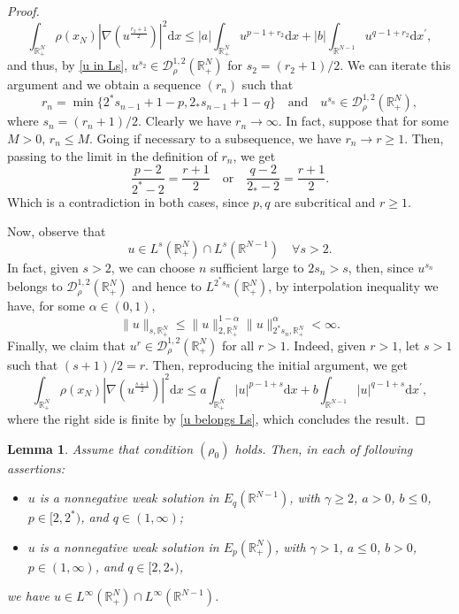 \documentclass[12pt,reqno]{amsart}
\newtheorem{lemma}[theorem]{Lemma}
\begin{document}
\begin{proof}
\[
\int_{\mathds{R}^N_+}\rho(x_N)|\nabla (u^{\frac{r_2+1}{2}})|^2\mathrm{d}x\leq |a| \int_{\mathds{R}^N_+} u^{p-1+r_2}\mathrm{d}x+|b|\int_{\mathds{R}^{N-1}}u^{q-1+r_2}\mathrm{d}x^\prime,
\]
and thus, by \eqref{u in Ls}, $u^{s_2} \in \mathcal{D}^{1,2}_\rho(\mathds{R}^N_+)$ for $s_2= (r_2+1)/2$. We can iterate this argument and we obtain a sequence $(r_n)$ such that
\[
r_n= \min\{2^\ast s_{n-1}+1-p,2_\ast s_{n-1}+1-q\}\quad\text{and}\quad u^{s_n}\in \mathcal{D}^{1,2}_\rho(\mathds{R}^N_+),
\]
where $s_n= (r_n+1)/2$. Clearly we have $r_n\longrightarrow \infty$. In fact, suppose that for some $M>0$, $r_n\leq M$. Going if necessary to a subsequence, we have $r_n\longrightarrow r\geq 1$. Then, passing to the limit in the definition of $r_n$, we get
\begin{equation*}
    \frac{p-2}{2^\ast-2}=\frac{r+1}{2}\quad\text{or}\quad \frac{q-2}{2_\ast-2}=\frac{r+1}{2}.
\end{equation*}
Which is a contradiction in both cases, since $p,q$ are subcritical and $r\geq1$.

Now, observe that 
\begin{equation}\label{u belongs Ls}
u \in L^s(\mathds{R}^N_+)\cap L^s(\mathds{R}^{N-1})\quad \forall s>2.
\end{equation}
In fact, given $s>2$, we can choose $n$ sufficient large to $2s_n>s$, then, since $u^{s_n}$ belongs to $ \mathcal{D}^{1,2}_\rho(\mathds{R}^N_+)$ and hence to $L^{2^\ast s_n}(\mathds{R}^N_+)$, by interpolation inequality we have, for some $\alpha \in (0,1)$,
\[
\|u\|_{s, \mathds{R}^N_+}\leq \|u\|_{2, \mathds{R}^N_+}^{1-\alpha}\|u\|_{2^\ast s_n, \mathds{R}^N_+}^\alpha <\infty.
\]
Finally, we claim that $u^r \in \mathcal{D}^{1,2}_\rho(\mathds{R}^N_+)$ for all $r>1$. Indeed, given $r>1$, let $s>1$ such that $(s+1)/2=r$. Then, reproducing the initial argument, we get
\[
\int_{\mathds{R}^N_+}\rho(x_N)|\nabla (u^{\frac{s+1}{2}})|^2\mathrm{d}x\leq a \int_{\mathds{R}^N_+} |u|^{p-1+s}\mathrm{d}x+b\int_{\mathds{R}^{N-1}}|u|^{q-1+s}\mathrm{d}x^\prime,
\]
where the right side is finite by \eqref{u belongs Ls}, which concludes the result.
\end{proof}

\begin{lemma}\label{Linfty}
Assume that condition $(\rho_0)$ holds. Then, in each of following assertions:
\begin{itemize}
    \item[$(i)$]  $u$ is a nonnegative weak solution in $E_q(\mathds{R}^{N-1})$, with $\gamma\geq 2$, $a > 0$, $b \leq 0$, $p \in [2,2^\ast)$, and $q \in (1,\infty)$;
    \item[$(ii)$]  $u$ is a nonnegative weak solution in $E_p(\mathds{R}^N_+)$, with $\gamma>1$, $a \leq 0$, $b > 0$, $p \in (1,\infty)$, and $q \in [2, 2_\ast)$,
\end{itemize}
we have $u \in L^\infty(\mathds{R}^N_+) \cap L^\infty(\mathds{R}^{N-1})$.
\end{lemma}
\end{document}
